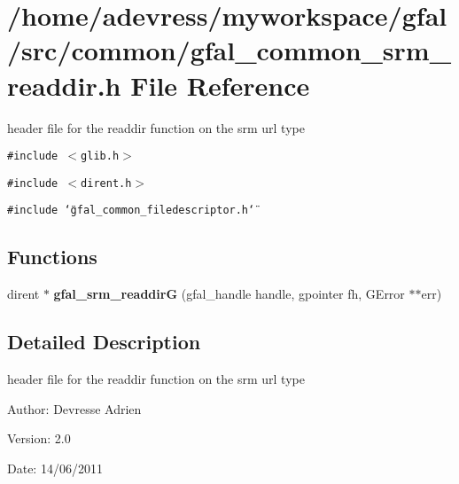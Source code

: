 \section{/home/adevress/myworkspace/gfal/src/common/gfal\_\-common\_\-srm\_\-readdir.h File Reference}
\label{gfal__common__srm__readdir_8h}
header file for the readdir function on the srm url type 

{\tt \#include $<$glib.h$>$}\par
{\tt \#include $<$dirent.h$>$}\par
{\tt \#include \char`\"{}gfal\_\-common\_\-filedescriptor.h\char`\"{}}\par
\subsection*{Functions}
\begin{CompactItemize}
\item 
dirent $\ast$ \textbf{gfal\_\-srm\_\-readdir\-G} (gfal\_\-handle handle, gpointer fh, GError $\ast$$\ast$err)\label{gfal__common__srm__readdir_8h_33c8825f86ee48c66f13e778a2bc1b31}

\end{CompactItemize}


\subsection{Detailed Description}
header file for the readdir function on the srm url type 

\begin{Desc}
\item[Author:]Devresse Adrien \end{Desc}
\begin{Desc}
\item[Version:]2.0 \end{Desc}
\begin{Desc}
\item[Date:]14/06/2011 \end{Desc}
